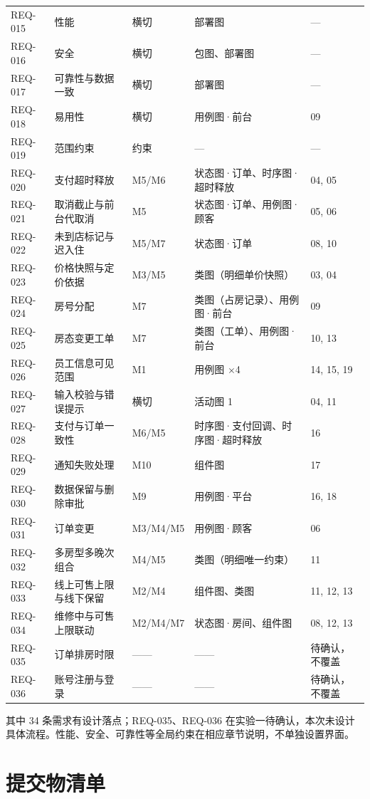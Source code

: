 {\begin{xltabular}{\textwidth}{@{}L{1.75cm}L{2.75cm}L{2.65cm}L{3.75cm}X@{}}
REQ-015 & 性能 & 横切 & 部署图 & — \\
REQ-016 & 安全 & 横切 & 包图、部署图 & — \\
REQ-017 & 可靠性与数据一致 & 横切 & 部署图 & — \\
REQ-018 & 易用性 & 横切 & 用例图·前台 & 09 \\
REQ-019 & 范围约束 & 约束 & — & — \\
REQ-020 & 支付超时释放 & M5/M6 & 状态图·订单、时序图·超时释放 & 04, 05 \\
REQ-021 & 取消截止与前台代取消 & M5 & 状态图·订单、用例图·顾客 & 05, 06 \\
REQ-022 & 未到店标记与迟入住 & M5/M7 & 状态图·订单 & 08, 10 \\
REQ-023 & 价格快照与定价依据 & M3/M5 & 类图（明细单价快照） & 03, 04 \\
REQ-024 & 房号分配 & M7 & 类图（占房记录）、用例图·前台 & 09 \\
REQ-025 & 房态变更工单 & M7 & 类图（工单）、用例图·前台 & 10, 13 \\
REQ-026 & 员工信息可见范围 & M1 & 用例图 $\times$4 & 14, 15, 19 \\
REQ-027 & 输入校验与错误提示 & 横切 & 活动图 1 & 04, 11 \\
REQ-028 & 支付与订单一致性 & M6/M5 & 时序图·支付回调、时序图·超时释放 & 16 \\
REQ-029 & 通知失败处理 & M10 & 组件图 & 17 \\
REQ-030 & 数据保留与删除审批 & M9 & 用例图·平台 & 16, 18 \\
REQ-031 & 订单变更 & M3/M4/M5 & 用例图·顾客 & 06 \\
REQ-032 & 多房型多晚次组合 & M4/M5 & 类图（明细唯一约束） & 11 \\
REQ-033 & 线上可售上限与线下保留 & M2/M4 & 组件图、类图 & 11, 12, 13 \\
REQ-034 & 维修中与可售上限联动 & M2/M4/M7 & 状态图·房间、组件图 & 08, 12, 13 \\
REQ-035 & 订单排房时限 & —— & —— & 待确认，不覆盖 \\
REQ-036 & 账号注册与登录 & —— & —— & 待确认，不覆盖 \\
\end{xltabular}
}

其中 34 条需求有设计落点；REQ-035、REQ-036 在实验一待确认，本次未设计具体流程。性能、安全、可靠性等全局约束在相应章节说明，不单独设置界面。

\needspace{9cm}
\section{提交物清单}

